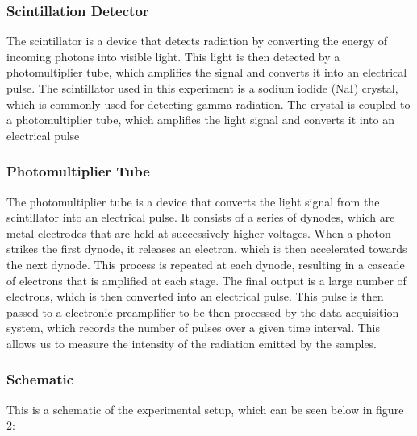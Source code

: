 \documentclass[12pt]{article}
\begin{document}
                \subsubsection{Scintillation Detector}
                        The scintillator is a device that detects radiation by converting the energy of incoming
                        photons into visible light. This light is then detected by a photomultiplier tube, which
                        amplifies the signal and converts it into an electrical pulse. The scintillator used in
                        this experiment is a sodium iodide (NaI) crystal, which is commonly used for detecting
                        gamma radiation. The crystal is coupled to a photomultiplier tube, which amplifies the
                        light signal and converts it into an electrical pulse


                \subsubsection{Photomultiplier Tube}
                        The photomultiplier tube is a device that converts the light signal from the scintillator
                        into an electrical pulse. It consists of a series of dynodes, which are metal electrodes
                        that are held at successively higher voltages. When a photon strikes the first dynode, it
                        releases an electron, which is then accelerated towards the next dynode. This process is
                        repeated at each dynode, resulting in a cascade of electrons that is amplified at each stage.
                        The final output is a large number of electrons, which is then converted into an electrical
                        pulse. This pulse is then passed to a electronic preamplifier to be then processed by the
                        data acquisition system, which records the number of pulses over a given time interval.
                        This allows us to measure the intensity of the radiation emitted by the samples.

                        
                \subsubsection{Schematic}
                        This is a schematic of the experimental setup, which can be seen below in figure 2: \\ \\
                        
\end{document}
